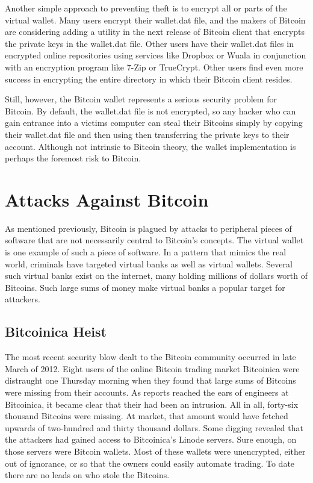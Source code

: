 \documentclass{report}
\begin{document}
Another simple approach to preventing theft is to encrypt all or parts of the virtual 
wallet.  Many users encrypt their wallet.dat file, and the makers of Bitcoin are considering 
adding a utility in the next release of Bitcoin client that encrypts the private keys 
in the wallet.dat file.  Other users have their wallet.dat files in encrypted online 
repositories using services like Dropbox or Wuala in conjunction with an encryption 
program like 7-Zip or TrueCrypt.  Other users find even more success in encrypting the 
entire directory in which their Bitcoin client resides.

Still, however, the Bitcoin wallet represents a serious security problem for Bitcoin.  
By default, the wallet.dat file is not encrypted, so any hacker who can gain entrance 
into a victims computer can steal their Bitcoins simply by copying their wallet.dat file 
and then using then transferring the private keys to their account.  Although not intrinsic 
to Bitcoin theory, the wallet implementation is perhaps the foremost risk to Bitcoin.

\section*{Attacks Against Bitcoin}
As mentioned previously, Bitcoin is plagued by attacks to peripheral pieces of software 
that are not necessarily central to Bitcoin's concepts.  The virtual wallet is one example
of such a piece of software.  In a pattern that mimics the real world, criminals have
targeted virtual banks as well as virtual wallets.  Several such virtual banks exist on
the internet, many holding millions of dollars worth of Bitcoins.  Such large sums of 
money make virtual banks a popular target for attackers.

\subsection*{Bitcoinica Heist}
The most recent security blow dealt to the Bitcoin community occurred in late March of
2012\cite{Goodwin:Bitcoinica}.  Eight users of the online Bitcoin trading market Bitcoinica were distraught one
Thursday morning when they found that large sums of Bitcoins were missing from their 
accounts.  As reports reached the ears of engineers at Bitcoinica, it became clear that
their had been an intrusion.  All in all, forty-six thousand Bitcoins were missing.  At
market, that amount would have fetched upwards of two-hundred and thirty thousand dollars.
Some digging revealed that the attackers had gained access to Bitcoinica's Linode servers.
Sure enough, on those servers were Bitcoin wallets.  Most of these wallets were unencrypted,
either out of ignorance, or so that the owners could easily automate trading.  To date there
are no leads on who stole the Bitcoins.
\end{document}
